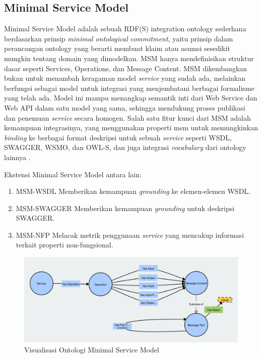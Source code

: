 \subsection{Minimal Service Model}
\label{subsec:minimal-service-model}

Minimal Service Model adalah sebuah RDF(S) integration ontology sederhana berdasarkan prinsip \textit{minimal ontological commitment}, yaitu prinsip dalam perancangan ontology yang berarti membuat klaim atau asumsi sesedikit mungkin tentang domain yang dimodelkan. MSM hanya mendefinisikan struktur dasar seperti Services, Operations, dan Message Content. MSM dikembangkan bukan untuk menambah keragaman model \textit{service} yang sudah ada, melainkan berfungsi sebagai model untuk integrasi yang menjembatani berbagai formalisme yang telah ada. Model ini mampu menangkap semantik inti dari Web Service dan Web API dalam satu model yang sama, sehingga mendukung proses publikasi dan penemuan \textit{service} secara homogen. Salah satu fitur kunci dari MSM adalah kemampuan integrasinya, yang menggunakan properti msm untuk memungkinkan \textit{binding} ke berbagai format deskripsi untuk sebuah \textit{service} seperti WSDL, SWAGGER, WSMO, dan OWL-S, dan juga integrasi \textit{vocabulary} dari ontology lainnya \parencite{iserve2015datamodel}.

Ekstensi Minimal Service Model antara lain:
\begin{enumerate}
  \item MSM-WSDL \break Memberikan kemampuan \textit{grounding} ke elemen-elemen WSDL.
  \item MSM-SWAGGER \break Memberikan kemampuan \textit{grounding} untuk deskripsi SWAGGER.
  \item MSM-NFP \break Melacak metrik penggunaan \textit{service} yang mencakup informasi terkait properti non-fungsional.
\end{enumerate}

\begin{figure}[ht]
  \centering
  \includegraphics[width=1\textwidth]{resources/chapter-2/msm-visualization.jpg}
  \caption{Visualisasi Ontologi Minimal Service Model \parencite{third2017linked}}
  \label{image:msm-visualization}
\end{figure}